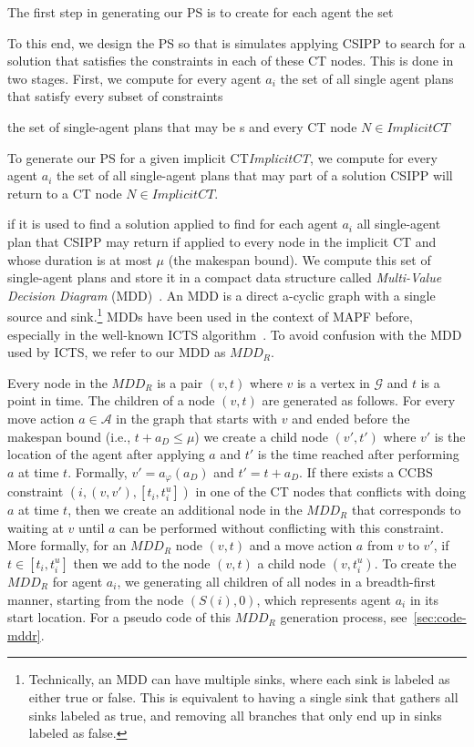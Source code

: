 \documentclass[review]{elsarticle}
\newcommand{\mddr}{\ensuremath{MDD_R}\xspace}
\newcommand{\implicitct}{\textit{ImplicitCT}\xspace}
\newcommand{\source}{\ensuremath{S}\xspace}
\newcommand{\ccbs}{\ac{CCBS}\xspace}
\newcommand{\ct}{\ac{CT}\xspace}
\newcommand{\csipp}{\ac{CSIPP}\xspace}
\newcommand{\ps}{\ac{PS}\xspace}
\newcommand{\mapf}{\ac{MAPF}\xspace}
\begin{document}
The first step in generating our \ps is to create for each agent the set 

To this end, we design the \ps so that is simulates applying \csipp to search for a solution that satisfies the constraints in each of these \ct nodes. 
This is done in two stages. 
First, we compute for every agent $a_i$ the set of all single agent plans that satisfy every subset of constraints 


the set of single-agent plans 
that may be s
and every \ct node $N\in \implicitct$ 


To generate our \ps for a given implicit \ct \implicitct, we compute for every agent $a_i$ the set of all single-agent plans that may part of a solution \csipp will return to a \ct node $N\in \implicitct$. 

if it is used to find a solution applied to find 
for each agent $a_i$ all single-agent plan that \csipp may return if applied to every node in the implicit \ct
and whose duration is at most $\mu$ (the makespan bound). 
We compute this set of single-agent plans and store it in a compact data structure called
\emph{Multi-Value Decision Diagram} (MDD)~\cite{srinivasan1990algorithms}. 
An MDD is a direct a-cyclic graph with a single source and sink.\footnote{Technically, an MDD can have multiple sinks, where each sink is labeled as either true or false. This is equivalent to having a single sink that gathers all sinks labeled as true, and removing all branches that only end up in sinks labeled as false.}
MDDs have been used in the context of \mapf before, especially in the well-known ICTS algorithm~\cite{sharon2013increasing}. To avoid confusion with the MDD used by ICTS, we refer to our MDD as \mddr. 



Every node in the \mddr is a pair $(v,t)$ where $v$ is a vertex in $\mathcal{G}$ and $t$ is a point in time. 
The children of a node $(v,t)$ are generated as follows. 
For every move action $a\in \mathcal{A}$ in the graph 
that starts with $v$ and ended before the makespan bound (i.e., $t+a_D\leq \mu$)
we create a child node $(v',t')$ where 
$v'$ is the location of the agent after applying $a$ and 
$t'$ is the time reached after performing $a$ at time $t$. 
Formally, $v'=a_\varphi(a_D)$ and $t'=t+a_D$. 
If there exists a \ccbs constraint $(i, (v,v'), [t_i, t_i^u])$ in one of the \ct nodes 
that conflicts with doing $a$ at time $t$, 
then we create an additional node in the \mddr that corresponds to waiting at $v$ until $a$ can be performed without conflicting with this constraint. 
More formally, for an \mddr node $(v,t)$ 
and a move action $a$ from $v$ to $v'$, 
if $t\in [t_i, t_i^u]$ then we add to the node $(v,t)$ a child node $(v,t_i^u)$. 
To create the \mddr for agent $a_i$, we generating all children of all nodes in a breadth-first manner, starting from the node $(\source(i),0)$, which represents agent $a_i$ in its start location. For a pseudo code of this \mddr generation process, see~\ref{sec:code-mddr}. 
\end{document}
